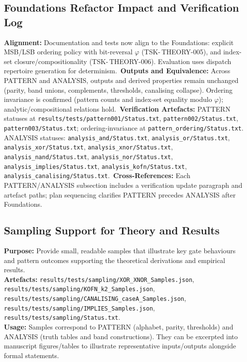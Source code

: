 \documentclass[11pt]{article}
\begin{document}
\subsection*{Foundations Refactor Impact and Verification Log}
\textbf{Alignment:} Documentation and tests now align to the Foundations: explicit MSB/LSB ordering policy with bit-reversal \(\varphi\) (TSK-\,THEORY-005), and index-set closure/compositionality (TSK-\,THEORY-006). Evaluation uses dispatch repertoire generation for determinism.\
\textbf{Outputs and Equivalence:} Across PATTERN and ANALYSIS, outputs and derived properties remain unchanged (parity, band unions, complements, thresholds, canalising collapse). Ordering invariance is confirmed (pattern counts and index-set equality modulo \(\varphi\)); analytic/compositional relations hold.\
\textbf{Verification Artefacts:} PATTERN statuses at \texttt{results/tests/pattern001/Status.txt}, \texttt{pattern002/Status.txt}, \texttt{pattern003/Status.txt}; ordering-invariance at \texttt{pattern\_ordering/Status.txt}. ANALYSIS statuses: \texttt{analysis\_and/Status.txt}, \texttt{analysis\_or/Status.txt}, \texttt{analysis\_xor/Status.txt}, \texttt{analysis\_xnor/Status.txt}, \texttt{analysis\_nand/Status.txt}, \texttt{analysis\_nor/Status.txt}, \texttt{analysis\_implies/Status.txt}, \texttt{analysis\_kofn/Status.txt}, \texttt{analysis\_canalising/Status.txt}.\
\textbf{Cross-References:} Each PATTERN/ANALYSIS subsection includes a verification update paragraph and artefact paths; plan sequencing clarifies PATTERN precedes ANALYSIS after Foundations.
\subsection*{Sampling Support for Theory and Results}
\textbf{Purpose:} Provide small, readable samples that illustrate key gate behaviours and pattern outcomes supporting the theoretical derivations and empirical results.\\
\textbf{Artefacts:} \texttt{results/tests/sampling/XOR\_XNOR\_Samples.json}, \texttt{results/tests/sampling/KOFN\_k2\_Samples.json}, \texttt{results/tests/sampling/CANALISING\_caseA\_Samples.json}, \texttt{results/tests/sampling/IMPLIES\_Samples.json}, \texttt{results/tests/sampling/Status.txt}.\\
\textbf{Usage:} Samples correspond to PATTERN (alphabet, parity, thresholds) and ANALYSIS (truth tables and band constructions). They can be excerpted into manuscript figures/tables to illustrate representative inputs/outputs alongside formal statements.
\end{document}

